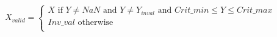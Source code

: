 \[
X_{valid} = 
\begin{cases}
X \text{ if } Y \ne NaN \text{ and } Y \ne Y_{inval} \text{ and } Crit\_min \le Y \le Crit\_max \\
Inv\_val \text{ otherwise}\\
\end{cases}
\]

